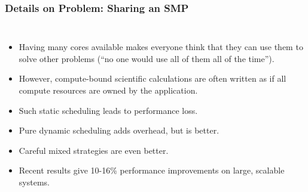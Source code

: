 \begin{frame}
\frametitle{Details on Problem: Sharing an SMP}
\begin{columns} %
\begin{itemize}
\tiny \item \tiny Having many cores available makes everyone think that  
they can use them to solve other problems (“no one would use all of them all of the time”).  \\  
\item \tiny However, compute-bound scientific calculations are often written as if all compute  
resources are owned by the application. \\ 
\item \tiny Such static scheduling leads to performance loss. \\ 
\item \tiny Pure dynamic scheduling adds overhead, but is better. \\ 
\item \tiny Careful mixed strategies are even better. \\ 
\item \tiny Recent results give 10-16\% performance improvements on large, scalable systems. \\  
\end{itemize}

\end{columns}
\end{frame}
